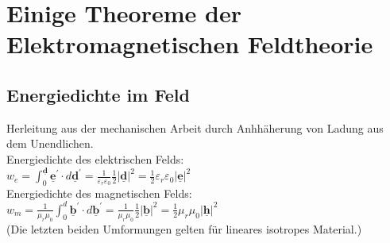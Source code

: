 \documentclass[english]{latex4ei/latex4ei_sheet}
\renewcommand{\vec}[1]{\underline{\boldsymbol{#1}}}
\begin{document}
\section{Einige Theoreme der Elektromagnetischen Feldtheorie}
\begin{sectionbox}
	\subsection{Energiedichte im Feld}
	Herleitung aus der mechanischen Arbeit durch Anhhäherung von Ladung aus dem Unendlichen.\\
	Energiedichte des elektrischen Felds:\\
	$w_{e}=\int_{0}^{\vec{d}} \vec{e}^{\prime} \cdot d \vec{d}^{\prime}= \frac{1}{\varepsilon_{r} \varepsilon_{0}} \frac{1}{2}|\vec{d}|^{2}=\frac{1}{2} \varepsilon_{r} \varepsilon_{0}|\vec{e}|^{2}$\\
	Energiedichte des magnetischen Felds:\\
	$w_{m}=\frac{1}{\mu_{r} \mu_{0}} \int_{0}^{d} \vec{b}^{\prime} \cdot d \vec{b}^{\prime}=\frac{1}{\mu_{r} \mu_{0}} \frac{1}{2}|\vec{b}|^{2}= \frac{1}{2} \mu_{r} \mu_{0}|\vec{h}|^{2}$\\
	(Die letzten beiden Umformungen gelten für lineares isotropes Material.)
\end{sectionbox}
\end{document}
